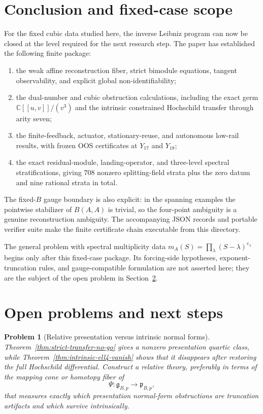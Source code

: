 \documentclass[11pt]{amsart}
\newtheorem{problem}[theorem]{Problem}
\newcommand{\C}{\mathbb C}
\newcommand{\gpres}{\mathfrak p}
\newcommand{\ghoch}{\mathfrak g}
\begin{document}
\section{Conclusion and fixed-case scope}\label{sec:fixed-case-conclusion}
For the fixed cubic data studied here, the inverse Leibniz program can now be closed at the level required for the next research step.  The paper has established the following finite package:
\begin{enumerate}[label=(\roman*)]
\item the weak affine reconstruction fiber, strict bimodule equations, tangent observability, and explicit global non-identifiability;
\item the dual-number and cubic obstruction calculations, including the exact germ $\C[[u,v]]/(v^3)$ and the intrinsic constrained Hochschild transfer through arity seven;
\item the finite-feedback, actuator, stationary-reuse, and autonomous low-rail results, with frozen OOS certificates at $Y_{17}$ and $Y_{18}$;
\item the exact residual-module, landing-operator, and three-level spectral stratifications, giving $708$ nonzero splitting-field strata plus the zero datum and nine rational strata in total.
\end{enumerate}
The fixed-$B$ gauge boundary is also explicit: in the spanning examples the pointwise stabilizer of $B(A,A)$ is trivial, so the four-point ambiguity is a genuine reconstruction ambiguity.  The accompanying JSON records and portable verifier suite make the finite certificate chain executable from this directory.

The general problem with spectral multiplicity data $m_A(S)=\prod_\lambda(S-\lambda)^{e_\lambda}$ begins only after this fixed-case package.  Its forcing-side hypotheses, exponent-truncation rules, and gauge-compatible formulation are not asserted here; they are the subject of the open problem in Section~\ref{sec:open-problems}.

\section{Open problems and next steps}\label{sec:open-problems}

\begin{problem}[Relative presentation versus intrinsic normal forms]
Theorem~\ref{thm:strict-transfer-no-go} gives a nonzero presentation quartic class, while Theorem~\ref{thm:intrinsic-ell4-vanish} shows that it disappears after restoring the full Hochschild differential.  Construct a relative theory, preferably in terms of the mapping cone or homotopy fiber of
\[
\Psi:\ghoch_{B,p}\to\gpres_{B,p},
\]
that measures exactly which presentation normal-form obstructions are truncation artifacts and which survive intrinsically.
\end{problem}
\end{document}
